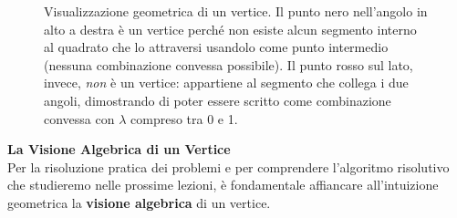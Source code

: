 \documentclass[12pt, a4paper]{article}
\begin{document}
	\begin{figure}[H]
		\centering
		\caption{Visualizzazione geometrica di un vertice. Il punto nero nell'angolo in alto a destra è un vertice perché non esiste alcun segmento interno al quadrato che lo attraversi usandolo come punto intermedio (nessuna combinazione convessa possibile). Il punto rosso sul lato, invece, \textit{non} è un vertice: appartiene al segmento che collega i due angoli, dimostrando di poter essere scritto come combinazione convessa con $\lambda$ compreso tra 0 e 1.}
	\end{figure}
	
	\vspace{0.6cm}
	\textbf{La Visione Algebrica di un Vertice}\\
	Per la risoluzione pratica dei problemi e per comprendere l'algoritmo risolutivo che studieremo nelle prossime lezioni, è fondamentale affiancare all'intuizione geometrica la \textbf{visione algebrica} di un vertice.
	
\end{document}
